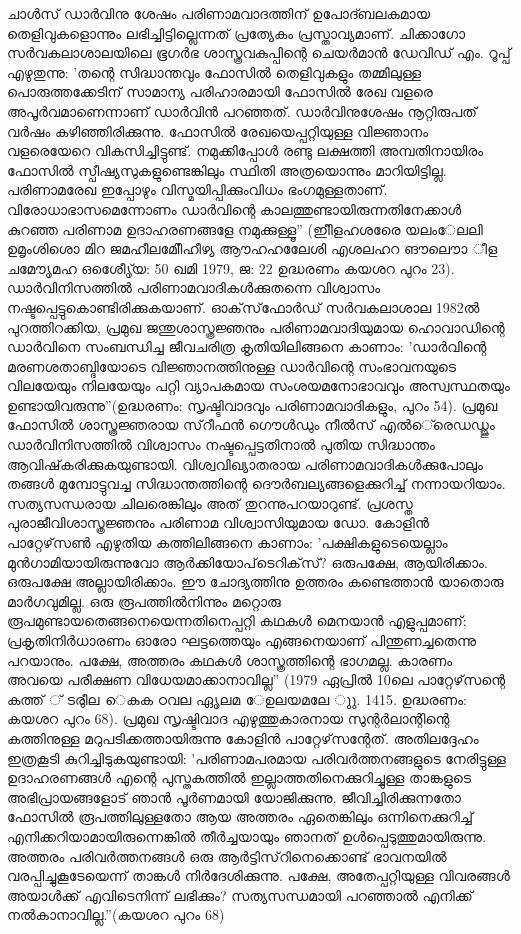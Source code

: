 ചാള്‍സ് ഡാര്‍വിനു ശേഷം പരിണാമവാദത്തിന് ഉപോദ്ബലകമായ തെളിവുകളൊന്നും ലഭിച്ചിട്ടില്ലെന്നത് പ്രത്യേകം പ്രസ്താവ്യമാണ്. ചിക്കാഗോ സര്‍വകലാശാലയിലെ ഭൂഗര്‍ഭ ശാസ്ത്രവകുപ്പിന്റെ ചെയര്‍മാന്‍ ഡേവിഡ് എം. റൂപ്പ് എഴുതുന്നു: 'തന്റെ സിദ്ധാന്തവും ഫോസില്‍ തെളിവുകളും തമ്മിലുള്ള പൊരുത്തക്കേടിന് സാമാന്യ പരിഹാരമായി ഫോസില്‍ രേഖ വളരെ അപൂര്‍വമാണെന്നാണ് ഡാര്‍വിന്‍ പറഞ്ഞത്. ഡാര്‍വിനുശേഷം നൂറ്റിരുപത് വര്‍ഷം കഴിഞ്ഞിരിക്കുന്നു. ഫോസില്‍ രേഖയെപ്പറ്റിയുള്ള വിജ്ഞാനം വളരെയേറെ വികസിച്ചിട്ടുണ്ട്. നമുക്കിപ്പോള്‍ രണ്ടു ലക്ഷത്തി അമ്പതിനായിരം ഫോസില്‍ സ്പീഷ്യസുകളുണ്ടെങ്കിലും സ്ഥിതി അത്രയൊന്നും മാറിയിട്ടില്ല. പരിണാമരേഖ ഇപ്പോഴും വിസ്മയിപ്പിക്കുംവിധം ഭംഗമുള്ളതാണ്. വിരോധാഭാസമെന്നോണം ഡാര്‍വിന്റെ കാലത്തുണ്ടായിരുന്നതിനേക്കാള്‍ കുറഞ്ഞ പരിണാമ ഉദാഹരണങ്ങളേ നമുക്കുള്ളൂ'' (ഇീിളഹശരെേ യലംേലലി ഉമൃംശിശാെ മിറ ജമഹീലമിീേഹീഴ്യ ആൗഹഹലേേശി എശലഹറ ങൗലൌാ ീള ചമൗേൃമഹ ഒശേെീൃ്യ: 50 ഖമി 1979, ജ: 22 ഉദ്ധരണം കയശറ പുറം 23).
ഡാര്‍വിനിസത്തില്‍ പരിണാമവാദികള്‍ക്കുതന്നെ വിശ്വാസം നഷ്ടപ്പെട്ടുകൊണ്ടിരിക്കുകയാണ്. ഓക്‌സ്‌ഫോര്‍ഡ് സര്‍വകലാശാല 1982ല്‍ പുറത്തിറക്കിയ, പ്രമുഖ ജന്തുശാസ്ത്രജ്ഞനും പരിണാമവാദിയുമായ ഹൊവാഡിന്റെ ഡാര്‍വിനെ സംബന്ധിച്ച ജീവചരിത്ര കൃതിയിലിങ്ങനെ കാണാം: 'ഡാര്‍വിന്റെ മരണശതാബ്ദിയോടെ വിജ്ഞാനത്തിനുള്ള ഡാര്‍വിന്റെ സംഭാവനയുടെ വിലയേയും നിലയേയും പറ്റി വ്യാപകമായ സംശയമനോഭാവവും അസ്വസ്ഥതയും ഉണ്ടായിവരുന്നു''(ഉദ്ധരണം: സൃഷ്ടിവാദവും പരിണാമവാദികളും, പുറം 54).
പ്രമുഖ ഫോസില്‍ ശാസ്ത്രജ്ഞരായ സ്‌റീഫന്‍ ഗൌള്‍ഡും നീല്‍സ് എല്‍െ്രെഡഡ്ജും ഡാര്‍വിനിസത്തില്‍ വിശ്വാസം നഷ്ടപ്പെട്ടതിനാല്‍ പുതിയ സിദ്ധാന്തം ആവിഷ്‌കരിക്കുകയുണ്ടായി. വിശ്വവിഖ്യാതരായ പരിണാമവാദികള്‍ക്കുപോലും തങ്ങള്‍ മുമ്പോട്ടുവച്ച സിദ്ധാന്തത്തിന്റെ ദൌര്‍ബല്യങ്ങളെക്കുറിച്ച് നന്നായറിയാം. സത്യസന്ധരായ ചിലരെങ്കിലും അത് തുറന്നുപറയാറുണ്ട്. പ്രശസ്ത പുരാജീവിശാസ്ത്രജ്ഞനും പരിണാമ വിശ്വാസിയുമായ ഡോ. കോളിന്‍ പാറ്റേഴ്‌സണ്‍ എഴുതിയ കത്തിലിങ്ങനെ കാണാം: 'പക്ഷികളുടെയെല്ലാം മുന്‍ഗാമിയായിരുന്നുവോ ആര്‍ക്കിയോപ്‌ടെറിക്‌സ്? ഒരുപക്ഷേ, ആയിരിക്കാം. ഒരുപക്ഷേ അല്ലായിരിക്കാം. ഈ ചോദ്യത്തിനു ഉത്തരം കണ്ടെത്താന്‍ യാതൊരു മാര്‍ഗവുമില്ല. ഒരു രൂപത്തില്‍നിന്നും മറ്റൊരു രൂപമുണ്ടായതെങ്ങനെയെന്നതിനെപ്പറ്റി കഥകള്‍ മെനയാന്‍ എളുപ്പമാണ്; പ്രകൃതിനിര്‍ധാരണം ഓരോ ഘട്ടത്തെയും എങ്ങനെയാണ് പിന്തുണച്ചതെന്നു പറയാനും. പക്ഷേ, അത്തരം കഥകള്‍ ശാസ്ത്രത്തിന്റെ ഭാഗമല്ല. കാരണം അവയെ പരീക്ഷണ വിധേയമാക്കാനാവില്ല'' (1979 ഏപ്രില്‍ 10ലെ പാറ്റേഴ്‌സന്റെ കത്ത് ് ടരീുല െകക ഠവല ഏൃലമ േഉലയമലേ ുു. 1415. ഉദ്ധരണം: കയശറ പുറം 68).
പ്രമുഖ സൃഷ്ടിവാദ എഴുത്തുകാരനായ സുന്റര്‍ലാന്റിന്റെ കത്തിനുള്ള മറുപടിക്കത്തായിരുന്നു കോളിന്‍ പാറ്റേഴ്‌സന്റേത്. അതിലദ്ദേഹം ഇത്രകൂടി കുറിച്ചിടുകയുണ്ടായി: 'പരിണാമപരമായ പരിവര്‍ത്തനങ്ങളുടെ നേരിട്ടുള്ള ഉദാഹരണങ്ങള്‍ എന്റെ പുസ്തകത്തില്‍ ഇല്ലാത്തതിനെക്കുറിച്ചുള്ള താങ്കളുടെ അഭിപ്രായങ്ങളോട് ഞാന്‍ പൂര്‍ണമായി യോജിക്കുന്നു. ജീവിച്ചിരിക്കുന്നതോ ഫോസില്‍ രൂപത്തിലുള്ളതോ ആയ അത്തരം ഏതെങ്കിലും ഒന്നിനെക്കുറിച്ച് എനിക്കറിയാമായിരുന്നെങ്കില്‍ തീര്‍ച്ചയായും ഞാനത് ഉള്‍പ്പെടുത്തുമായിരുന്നു. അത്തരം പരിവര്‍ത്തനങ്ങള്‍ ഒരു ആര്‍ട്ടിസ്‌റിനെക്കൊണ്ട് ഭാവനയില്‍ വരപ്പിച്ചുകൂടേയെന്ന് താങ്കള്‍ നിര്‍ദേശിക്കുന്നു. പക്ഷേ, അതേപ്പറ്റിയുള്ള വിവരങ്ങള്‍ അയാള്‍ക്ക് എവിടെനിന്ന് ലഭിക്കും? സത്യസന്ധമായി പറഞ്ഞാല്‍ എനിക്ക് നല്‍കാനാവില്ല.''(കയശറ പുറം 68)
